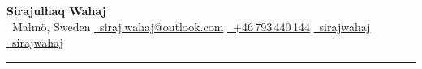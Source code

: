 \begin{center}
  {\LARGE\bfseries\textcolor{accent}{Sirajulhaq Wahaj}}\\[4pt]
  {\small
    \textcolor{soft}{\faMapMarker*~Malm\"{o}, Sweden}
    \quad\textbar\quad
    \href{mailto:siraj.wahaj@outlook.com}{\faEnvelope~siraj.wahaj@outlook.com}
    \quad\textbar\quad
    \href{tel:+46793440144}{\faPhone~+46\,793\,440\,144}
    \quad\textbar\quad
    \href{https://linkedin.com/in/sirajwahaj}{\faLinkedin~sirajwahaj}
    \quad\textbar\quad
    \href{https://github.com/sirajwahaj}{\faGithub~sirajwahaj}
  }
\end{center}
\vspace{-2pt}
\textcolor{accent}{\rule{\linewidth}{1pt}}
\vspace{2pt}
